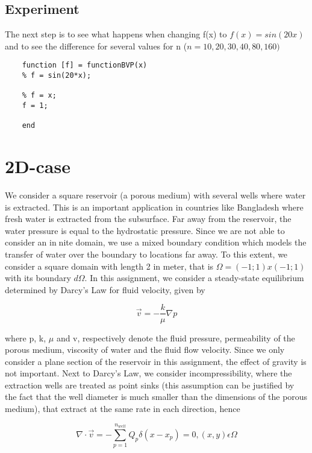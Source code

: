 \documentclass{report}
\begin{document}
\section{Experiment}

The next step is to see what happens when changing f(x) to $f(x)=sin(20x)$ and to see the difference for several values for n ($n=10,20,30,40,80,160)$ 
	
\begin{lstlisting}
	function [f] = functionBVP(x)
	% f = sin(20*x);
	
	% f = x;
	f = 1;
	
	end
\end{lstlisting}





\chapter{2D-case}

We consider a square reservoir (a porous medium) with several wells where water is extracted. This is an important application in countries like Bangladesh where fresh water is extracted from the subsurface. Far away from the reservoir, the water pressure is equal to the hydrostatic pressure. Since we are not able to consider an innite domain, we use a mixed boundary condition which models the transfer of water over the boundary to locations far away. To this extent, we consider a square domain with length 2 in meter, that is $\Omega= (-1; 1) x (-1; 1)$ with its boundary $d\Omega$. In this assignment, we consider a steady-state equilibrium determined by Darcy's Law for fluid velocity, given by

\begin{equation}
\vec{v}=-\frac{k}{\mu}\nabla p
\end{equation}
\medskip

where p, k, $\mu$ and v, respectively denote the 
fluid pressure, permeability of the porous medium, viscosity of water and the 
fluid flow velocity. Since we only
consider a plane section of the reservoir in this assignment, the effect of gravity is not important. Next to Darcy's Law, we consider incompressibility, where
the extraction wells are treated as point sinks (this assumption can be justified by the fact that the well diameter is much smaller than the dimensions of the
porous medium), that extract at the same rate in each direction, hence

\begin{equation}
	\nabla\cdot\vec{v}=-\sum_{p=1}^{n_{well}}Q_p\delta(x-x_p)=0,(x,y) \epsilon\Omega 
\end{equation}
\end{document}
